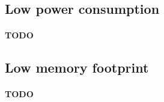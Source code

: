 \documentclass[a4paper, 11pt]{article}
\begin{document}
\subsection{Low power consumption}
\paragraph{}
\textbf{TODO}

\subsection{Low memory footprint}
\paragraph{}
\textbf{TODO}








\end{document}
